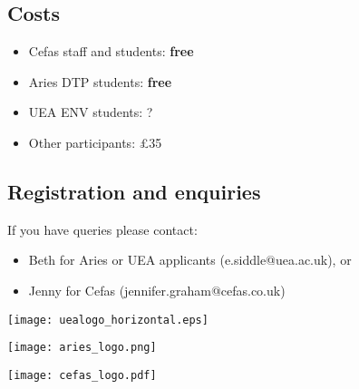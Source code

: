 \documentclass[paper=a4]{scrartcl}
\newcommand*{\pyitem}{\item [{\texttt{[image: python\_logo.png]}}]}
\begin{document}
\subsection*{Costs}
\begin{itemize}
\pyitem Cefas staff and students: \textbf{free}
\pyitem Aries DTP students: \textbf{free}
\pyitem UEA ENV students: ?
\pyitem Other participants: \pounds 35
\end{itemize}
\vspace{-0.5cm}

\subsection*{Registration and enquiries}
If you have queries please contact:
\begin{itemize}
\pyitem Beth for Aries or UEA applicants (e.siddle@uea.ac.uk), or
\pyitem Jenny for Cefas (jennifer.graham@cefas.co.uk)
\end{itemize}

\begin{center}
\begin{minipage}{0.2\linewidth}
    \texttt{[image: uealogo\_horizontal.eps]}
\end{minipage}
\hspace{2cm}
\begin{minipage}{0.2\linewidth}
    \texttt{[image: aries\_logo.png]}
\end{minipage}
\hspace{2cm}
\begin{minipage}{0.2\linewidth}
    \texttt{[image: cefas\_logo.pdf]}
\end{minipage}
\end{center}
\end{document}
